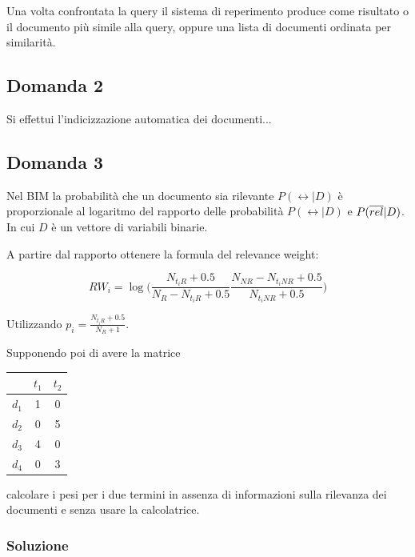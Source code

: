 Una volta confrontata la query il sistema di reperimento produce come risultato o il documento più simile alla query, oppure una lista di documenti ordinata per similarità.

\subsection{Domanda 2}

Si effettui l'indicizzazione automatica dei documenti...

\subsection{Domanda 3}

Nel BIM la probabilità che un documento sia rilevante $P(\rel |D)$ è proporzionale al logaritmo del rapporto delle probabilità $P(\rel | D)$ e $P(\overline{rel} | D)$. In cui $D$ è un vettore di variabili binarie.

A partire dal rapporto ottenere la formula del relevance weight:

$$
RW_i = \log \bigg( \frac{N_{t_iR} + 0.5}{N_R - N_{t_iR} +0.5} \frac{N_{NR} - N_{t_iNR} + 0.5}{N_{t_iNR} +0.5} \bigg)
$$

Utilizzando $p_i = \frac{N_{t_iR} +0.5}{N_R + 1}$.

\noindent Supponendo poi di avere la matrice 

\begin{table}[htbp]
	\centering
	\begin{tabular}{c|c|c|}
		\cline{2-3}
		& $t_1$ & $t_2$ \\ \hline
		\multicolumn{1}{|c|}{$d_1$} & 1  & 0  \\ \hline
		\multicolumn{1}{|c|}{$d_2$} & 0  & 5  \\ \hline
		\multicolumn{1}{|c|}{$d_3$} & 4  & 0  \\ \hline
		\multicolumn{1}{|c|}{$d_4$} & 0  & 3  \\ \hline
	\end{tabular}
\end{table}

\noindent calcolare i pesi per i due termini in assenza di informazioni sulla rilevanza dei documenti e senza usare la calcolatrice.

\subsubsection{Soluzione}

